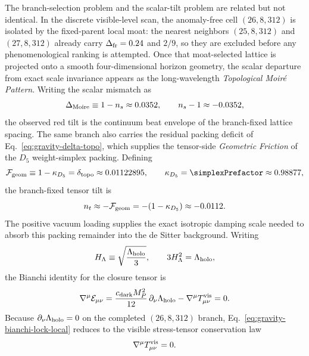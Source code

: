 \documentclass[11pt]{article}
\begin{document}
The branch-selection problem and the scalar-tilt problem are related but not
identical. In the discrete visible-level scan, the anomaly-free cell
$(26,8,312)$ is isolated by the fixed-parent local moat: the nearest
neighbors $(25,8,312)$ and $(27,8,312)$ already carry
$\Delta_{\rm fr}=0.24$ and $2/9$, so they are excluded before any
phenomenological ranking is attempted. Once that moat-selected lattice is
projected onto a smooth four-dimensional horizon geometry, the scalar
departure from exact scale invariance appears as the long-wavelength
\emph{Topological Moir\'e Pattern}. Writing the scalar mismatch as
\begin{equation}
\label{eq:gravity-moire-scalar}
 \Delta_{\rm Moire}
 \equiv
 1-n_s
 \approx
 0.0352,
 \qquad
 n_s-1\approx -0.0352,
\end{equation}
the observed red tilt is the continuum beat envelope of the branch-fixed
lattice spacing. The same branch also carries the residual packing deficit of
Eq.~\eqref{eq:gravity-delta-topo}, which supplies the tensor-side
\emph{Geometric Friction} of the $D_5$ weight-simplex packing. Defining
\begin{equation}
\label{eq:gravity-geometric-friction}
 \mathcal F_{\rm geom}
 \equiv
 1-\kappa_{D_5}
 =
 \delta_{\rm topo}
 \approx
 0.01122895,
 \qquad
 \kappa_{D_5}=\simplexPrefactor\approx 0.98877,
\end{equation}
the branch-fixed tensor tilt is
\begin{equation}
\label{eq:gravity-tensor-friction}
 n_t\approx -\mathcal F_{\rm geom}=-(1-\kappa_{D_5})\approx -0.0112.
\end{equation}
The positive vacuum loading supplies the exact isotropic damping scale needed
to absorb this packing remainder into the de Sitter background. Writing
\begin{equation}
\label{eq:gravity-hubble-scale}
 H_{\Lambda}\equiv \sqrt{\frac{\Lambda_{\rm holo}}{3}},
 \qquad
 3H_{\Lambda}^2=\Lambda_{\rm holo},
\end{equation}
the Bianchi identity for the closure tensor is
\begin{equation}
\label{eq:gravity-bianchi-lock-local}
 \nabla^{\mu}\mathcal E_{\mu\nu}
 =
 \frac{c_{\rm dark}M_P^2}{12}\,\partial_{\nu}\Lambda_{\rm holo}
 -\nabla^{\mu}T^{\rm vis}_{\mu\nu}
 =0.
\end{equation}
Because $\partial_{\nu}\Lambda_{\rm holo}=0$ on the completed $(26,8,312)$
branch, Eq.~\eqref{eq:gravity-bianchi-lock-local} reduces to the visible
stress-tensor conservation law
\begin{equation}
\label{eq:gravity-visible-stress-conservation}
 \nabla^{\mu}T^{\rm vis}_{\mu\nu}=0.
\end{equation}
\end{document}
